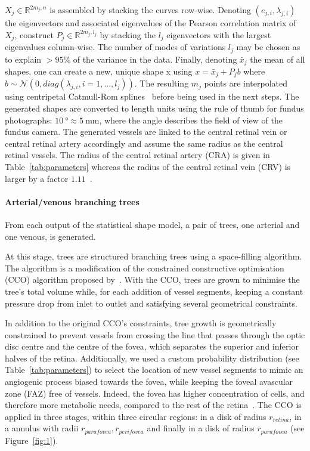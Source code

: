 \documentclass[11pt,]{article}
\begin{document}
$X_j\in\mathbb R^{2m_j,n}$ is assembled by stacking the curves
row-wise. Denoting $(e_{j,i}, \lambda_{j,i})$ the eigenvectors and
associated eigenvalues of the Pearson correlation matrix of $X_j$,
construct $P_j\in\mathbb R^{2m_j,l_j}$ by stacking the $l_j$
eigenvectors with the largest eigenvalues column-wise. The number of
modes of variations $l_j$ may be chosen as to explain $>95\%$ of the
variance in the data. Finally, denoting $\bar x_j$ the mean of all
shapes, one can create a new, unique shape x using $x=\bar x_j + P_jb$
where $b\sim\mathcal N(0,diag(\lambda_{j,i}, i=1,...,l_j))$. The
resulting $m_j$ points are interpolated using centripetal Catmull-Rom splines~\cite{Catmull_1974} before being used in the next steps.
The generated shapes are converted to length units using the rule of thumb for fundus photographs: $\SI{10}{\degree}\approx\SI{5}{\mm}$, where the angle describes the
field of view of the fundus camera. The generated vessels are linked
to the central retinal vein or central retinal artery accordingly and
assume the same radius as the central retinal vessels.
The radius of the central retinal artery (CRA) is given in Table~\ref{tab:parameters} whereas the radius of the
central retinal vein (CRV) is larger by a factor $1.11$~\cite{Goldenberg2013}.

\paragraph{Arterial/venous branching trees}\label{sec:CCO}

From each output of the statistical shape model, a pair of trees, one
arterial and one venous, is generated.

At this stage, trees are structured branching trees using a
space-filling algorithm. The algorithm is a modification of the
constrained constructive optimisation (CCO) algorithm proposed
by~\cite{Talou2021}. With the CCO, trees are grown to minimise the tree’s
total volume while, for each addition of vessel segments,
keeping a constant pressure drop from
inlet to outlet and satisfying several geometrical constraints.

In addition to the original CCO’s constraints, tree growth is
geometrically constrained to prevent vessels from crossing the line
that passes through the optic disc centre and the centre of the fovea,
which separates the superior and inferior halves of the
retina. Additionally, we used a custom probability distribution
(see Table~\ref{tab:parameters}) 
to select the location of new vessel segments to mimic an angiogenic
process biased towards the fovea, while keeping the foveal avascular
zone (FAZ) free of vessels. 
Indeed, the fovea has higher concentration
of cells, and therefore more metabolic needs, compared to the rest of
the retina~\cite{Zouache2022}.
The CCO is applied in three stages, within three circular regions: in
a disk of radius $r_{retina}$, in a annulus with radii $r_{parafovea},
r_{perifovea}$ and finally in a disk of radius $r_{parafovea}$
(see Figure~\ref{fig:1}).
\end{document}
